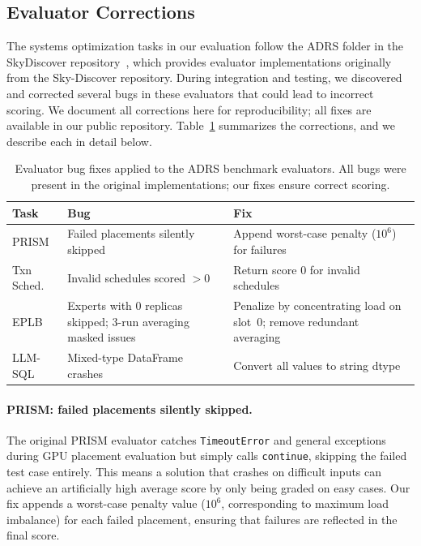 \subsection{Evaluator Corrections}
\label{app:eval_corrections}

The systems optimization tasks in our evaluation follow the ADRS folder in the SkyDiscover repository~\citep{skydiscover2026}, which provides evaluator implementations originally from the Sky-Discover repository. During integration and testing, we discovered and corrected several bugs in these evaluators that could lead to incorrect scoring. We document all corrections here for reproducibility; all fixes are available in our public repository. Table~\ref{tab:eval_fixes} summarizes the corrections, and we describe each in detail below.

\begin{table}[t]
\caption{Evaluator bug fixes applied to the ADRS benchmark evaluators. All bugs were present in the original implementations; our fixes ensure correct scoring.}
\label{tab:eval_fixes}
\centering
\scriptsize
\setlength{\tabcolsep}{8pt}
\begin{tabular}{l p{5cm} p{6cm}}
\toprule
\textbf{Task} & \textbf{Bug} & \textbf{Fix} \\
\midrule
PRISM & Failed placements silently skipped & Append worst-case penalty (${10}^{6}$) for failures \\
Txn Sched. & Invalid schedules scored $>0$ & Return score 0 for invalid schedules \\
EPLB & Experts with 0 replicas skipped; 3-run averaging masked issues & Penalize by concentrating load on slot~0; remove redundant averaging \\
LLM-SQL & Mixed-type DataFrame crashes & Convert all values to string dtype \\
\bottomrule
\end{tabular}
\end{table}

\paragraph{PRISM: failed placements silently skipped.}
The original PRISM evaluator catches \texttt{TimeoutError} and general exceptions during GPU placement evaluation but simply calls \texttt{continue}, skipping the failed test case entirely. This means a solution that crashes on difficult inputs can achieve an artificially high average score by only being graded on easy cases. Our fix appends a worst-case penalty value ($10^6$, corresponding to maximum load imbalance) for each failed placement, ensuring that failures are reflected in the final score.

